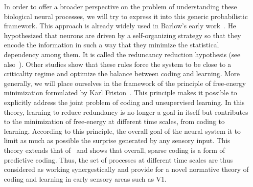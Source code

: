 \documentclass[draft]{article} %
\begin{document}
In order to offer a broader perspective on the problem of understanding these biological neural processes, we will try to express it into this generic probabilistic framework.
This approach is already widely used in Barlow's early work~\citep{Barlow61}. He hypothesized that neurons are driven by a self-organizing strategy so that they encode the information in such a way that they minimize the statistical dependency among them. It is called the reduncancy reduction hypothesis (see also~\citep{Atick92}). %
Other studies show that these rules force the system to be close to a criticality regime and optimize the balance between coding and learning. %
More generally, we will place ourselves in the framework of the principle of free-energy minimization formulated by Karl Friston~\citep{Friston12}. This principle makes it possible to explicitly address the joint problem of coding and unsupervised learning. In this theory, learning to reduce redundancy is no longer a goal in itself but contributes to the minimization of free-energy at different time scales, from coding to learning. %
According to this principle, the overall goal of the neural system it to limit as much as possible the surprise generated by any sensory input.
This theory extends that of~\citep{Olshausen97} and shows that overall, sparse coding is a form of predictive coding. Thus, the set of processes at different time scales are thus considered as working synergestically and provide for a novel normative theory of coding and learning in early sensory areas such as V1.
\end{document}
